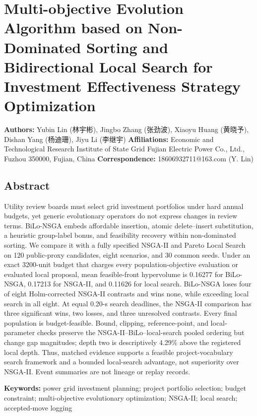 \documentclass[
]{article}
\author{Yubin Lin, Jingbo Zhang, Xiaoyu Huang, Dishan Yang, Jiyu Li}
\date{}
\begin{document}
\section{Multi-objective Evolution Algorithm based on Non-Dominated Sorting and Bidirectional Local Search for Investment Effectiveness Strategy Optimization}\label{multi-objective-evolution-algorithm-based-on-non-dominated-sorting-and-bidirectional-local-search-for-investment-effectiveness-strategy-optimization}

\textbf{Authors:} Yubin Lin (林宇彬), Jingbo Zhang (张劲波), Xiaoyu Huang (黄晓予), Dishan Yang (杨迪珊), Jiyu Li (李继宇) \textbf{Affiliations:} Economic and Technological Research Institute of State Grid Fujian Electric Power Co., Ltd., Fuzhou 350000, Fujian, China \textbf{Correspondence:} 18606932711@163.com (Y. Lin)

\subsection{Abstract}\label{abstract}

Utility review boards must select grid investment portfolios under hard annual budgets, yet generic evolutionary operators do not express changes in review terms. BiLo-NSGA embeds affordable insertion, atomic delete--insert substitution, a heuristic group-label bonus, and feasibility recovery within non-dominated sorting. We compare it with a fully specified NSGA-II and Pareto Local Search on 120 public-proxy candidates, eight scenarios, and 30 common seeds. Under an exact 3200-unit budget that charges every population-objective evaluation or evaluated local proposal, mean feasible-front hypervolume is 0.16277 for BiLo-NSGA, 0.17213 for NSGA-II, and 0.11626 for local search. BiLo-NSGA loses four of eight Holm-corrected NSGA-II contrasts and wins none, while exceeding local search in all eight. At equal 0.20-s search deadlines, the NSGA-II comparison has three significant wins, two losses, and three unresolved contrasts. Every final population is budget-feasible. Bound, clipping, reference-point, and local-parameter checks preserve the NSGA-II--BiLo--local-search pooled ordering but change gap magnitudes; depth two is descriptively 4.29\% above the registered local depth. Thus, matched evidence supports a feasible project-vocabulary search framework and a bounded local-search advantage, not superiority over NSGA-II. Event summaries are not lineage or replay records.

\textbf{Keywords:} power grid investment planning; project portfolio selection; budget constraint; multi-objective evolutionary optimization; NSGA-II; local search; accepted-move logging
\end{document}
